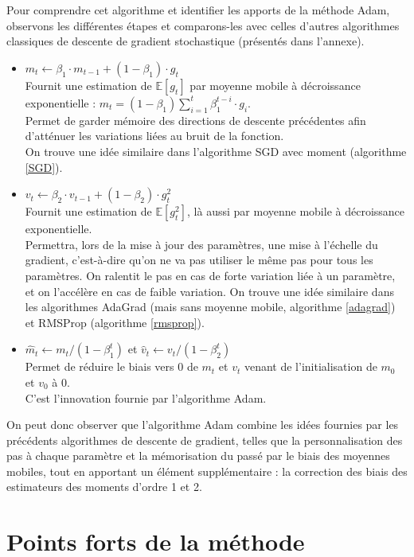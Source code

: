 \documentclass[11pt,a4paper, french]{article}
\newcommand{\dsum}[2]{\displaystyle\sum_{#1}^{#2}}
\newcommand{\bit}{\begin{itemize}}
\newcommand{\eit}{\end{itemize}}
\theoremstyle{definition}
\begin{document}
Pour comprendre cet algorithme et identifier les apports de la méthode Adam, observons les différentes étapes et comparons-les avec celles d'autres algorithmes classiques de descente de gradient stochastique (présentés dans l'annexe).

\bit
\item $m_t \longleftarrow \beta_1\cdotp m_{t-1}+(1-\beta_1)\cdotp g_t$\\
Fournit une estimation de $\mathbb E[g_t]$ par moyenne mobile à décroissance exponentielle : $m_t=(1-\beta_1)\dsum{i=1}t\beta_1^{t-i}\cdotp g_i$.\\
Permet de garder mémoire des directions de descente précédentes afin d'atténuer les variations liées au bruit de la fonction.\\
On trouve une idée similaire dans l'algorithme SGD  avec moment (algorithme \ref{SGD}).

\item $v_t \longleftarrow \beta_2\cdotp v_{t-1}+(1-\beta_2)\cdotp g_t^2$\\
Fournit une estimation de $\mathbb E[g_t^2]$, là aussi par moyenne mobile à décroissance exponentielle.\\
Permettra, lors de la mise à jour des paramètres, une mise à l'échelle du gradient, c'est-à-dire qu'on ne va pas utiliser le même pas pour tous les paramètres. On ralentit le pas en cas de forte variation liée à un paramètre, et on l'accélère en cas de faible variation. 
On trouve une idée similaire dans les algorithmes AdaGrad (mais sans moyenne mobile, algorithme \ref{adagrad}) et RMSProp (algorithme \ref{rmsprop}). 

\item  $\widehat m_t \longleftarrow m_t/(1-\beta_1^t)$ et 
$\widehat v_t \longleftarrow v_t/(1-\beta_2^t)$\\
Permet de réduire le biais vers 0 de $m_t$ et $v_t$ venant de l'initialisation de $m_0$ et $v_0$ à 0. \\
C'est l'innovation fournie par l'algorithme Adam.
\eit

On peut donc observer que l'algorithme Adam combine les idées fournies par les précédents algorithmes de descente de gradient, telles que la personnalisation des pas à chaque paramètre et la mémorisation du passé par le biais des moyennes mobiles, tout en apportant un élément supplémentaire : la correction des biais des estimateurs des moments d'ordre 1 et 2. 



\section{Points forts de la méthode}
\end{document}
